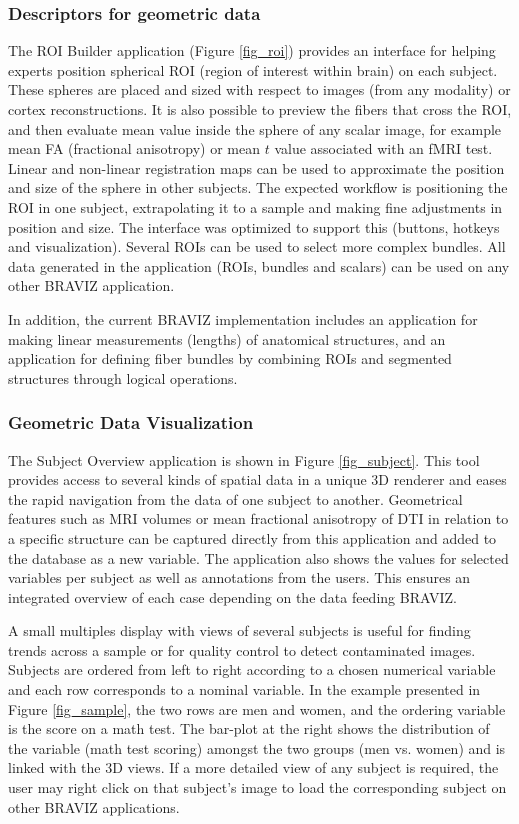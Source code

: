 \documentclass[twocolumn]{svjour3}
\begin{document}
\subsubsection{Descriptors for geometric data}

The ROI Builder application (Figure \ref{fig_roi}) provides an interface for helping experts position spherical ROI  (region of interest within brain) on each subject. These spheres are placed and sized with respect to images (from any modality) or cortex reconstructions. It is also possible to preview the fibers that cross the ROI, and then evaluate mean value inside the sphere of any scalar image, for example mean FA (fractional anisotropy) or mean $t$ value associated with an fMRI test. 
Linear and non-linear registration maps can be used to approximate the position and size of the sphere in other subjects. The expected workflow is positioning the ROI in one subject, extrapolating it to a sample and making fine adjustments in position and size. The interface was optimized to support this (buttons, hotkeys and visualization). Several ROIs can be used to select more complex bundles. All data generated in the application (ROIs, bundles and scalars) can be used on any other BRAVIZ application. 

In addition, the current BRAVIZ implementation includes an application for making linear measurements (lengths) of anatomical structures, and an application for defining fiber bundles by combining ROIs and segmented structures through logical operations.


\subsubsection{Geometric Data Visualization}

The Subject Overview application is shown in Figure \ref{fig_subject}. This tool  provides access to several kinds of spatial data in a unique 3D renderer and eases the rapid navigation from the data of one subject to another. Geometrical features such as MRI volumes or mean fractional anisotropy of DTI in relation to a specific structure can be captured directly from this application and added to the database as a new variable. The application also shows the values for selected variables per subject as well as annotations from the users. This ensures an integrated overview of each case depending on the data feeding BRAVIZ.

A small multiples display \cite{tufte_visual_1983} with views  of several subjects is useful for finding trends across a sample or for quality control to detect contaminated images. Subjects are ordered from left to right according to a chosen numerical variable and each row corresponds to a nominal variable. In the example presented in Figure \ref{fig_sample}, the two rows are men and women, and the ordering variable is the score on a math test. The bar-plot at the right shows the distribution of the variable (math test scoring) amongst the two groups (men vs. women) and is linked with the 3D views. If a more detailed view of any subject is required, the user may right click on that subject’s image to load the corresponding subject on other BRAVIZ applications.
\end{document}
